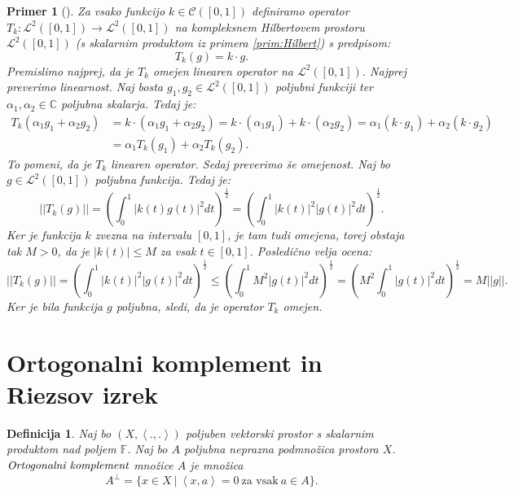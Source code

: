 \documentclass[12pt,a4paper,oneside,fleqn,openany]{book}
\newtheorem{definicija}[izrek]{Definicija}
\newtheorem{primer*}[izrek]{Primer}
\newenvironment{primer}[1][]{\begin{primer*}[#1]\renewcommand*{\qedsymbol}{$\diamondsuit$}\pushQED{\qed}}{\popQED\end{primer*}}
\newcommand{\F}{\mathbb{F}}
\newcommand{\C}{\mathbb{C}}
\newcommand{\abs}[1]{\ensuremath{\lvert #1 \rvert}}
\newcommand{\norm}[1]{\abs{\abs{#1}}}
\newcommand{\pojem}[1]{\ensuremath{\emph{#1}}}
\newcommand{\Sp}[2]{\ensuremath{\left<#1, #2\right>}}
\newcommand{\map}[3]{\ensuremath{{#1}:{#2}\rightarrow{#3}}}
\begin{document}
\begin{primer}
	\label{prim:Tkop}
	Za vsako funkcijo $k\in \mathcal{C}([0, 1])$ definiramo operator $\map{T_k}{\mathcal{L}^2([0, 1])}{\mathcal{L}^2([0, 1])}$ na kompleksnem Hilbertovem prostoru $\mathcal{L}^2([0, 1])$ (s skalarnim produktom iz primera \ref{prim:Hilbert}) s predpisom: $$T_k(g) = k\cdot g.$$ Premislimo najprej, da je $T_k$ omejen linearen operator na $\mathcal{L}^2([0, 1])$. Najprej preverimo linearnost. Naj bosta $g_1, g_2\in \mathcal{L}^2([0, 1])$ poljubni funkciji ter $\alpha_1, \alpha_2\in\C$ poljubna skalarja. Tedaj je: \begin{align*}
		T_k(\alpha_1g_1 + \alpha_2g_2) &= k\cdot(\alpha_1g_1 + \alpha_2g_2) = k\cdot (\alpha_1g_1) + k\cdot (\alpha_2g_2) = \alpha_1(k\cdot g_1) + \alpha_2(k\cdot g_2) \\ &= \alpha_1T_k(g_1) + \alpha_2T_k(g_2).
	\end{align*}
	To pomeni, da je $T_k$ linearen operator. Sedaj preverimo še omejenost. Naj bo $g\in \mathcal{L}^2([0, 1])$ poljubna funkcija. Tedaj je: $$\norm{T_k(g)} = \left(\int_{0}^{1}\abs{k(t)g(t)}^2dt\right)^{\frac{1}{2}} = \left(\int_{0}^{1}\abs{k(t)}^2\abs{g(t)}^2dt\right)^{\frac{1}{2}}.$$ Ker je funkcija $k$ zvezna na intervalu $[0, 1]$, je tam tudi omejena, torej obstaja tak $M>0$, da je $\abs{k(t)}\leq M$ za vsak $t\in [0, 1]$. Posledično velja ocena: $$\norm{T_k(g)} = \left(\int_{0}^{1}\abs{k(t)}^2\abs{g(t)}^2dt\right)^{\frac{1}{2}} \leq \left(\int_{0}^{1}M^2\abs{g(t)}^2dt\right)^{\frac{1}{2}} = \left(M^2 \int_{0}^{1}\abs{g(t)}^2dt\right)^{\frac{1}{2}} = M \norm{g}.$$
	Ker je bila funkcija $g$ poljubna, sledi, da je operator $T_k$ omejen.
\end{primer}

\section[Ortogonalni komplement in Riezsov izrek]{Ortogonalni komplement in Riezsov izrek}

\begin{definicija}
	\label{def:ortogcompl}
	Naj bo $(X, \Sp{.}{.})$ poljuben vektorski prostor s skalarnim produktom nad poljem $\F$. Naj bo $A$ poljubna neprazna podmnožica prostora $X$. \pojem{Ortogonalni komplement} množice $A$ je množica $$A^\bot = \{x\in X~|~\Sp{x}{a}=0~\text{za vsak}~a\in A\}.$$
\end{definicija}
\end{document}
